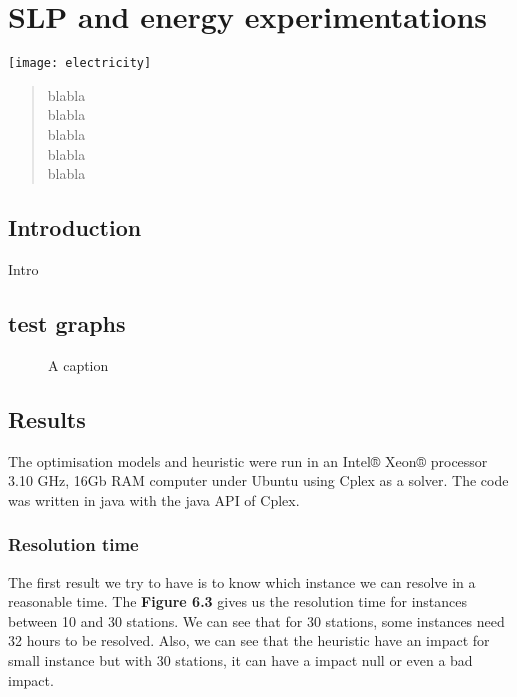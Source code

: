 \chapter{SLP and energy experimentations} \label{chap:slpEnergyExp}
\begin{bibunit}[ieeetr]
\minitoc
\vspace{2cm}

\begin{minipage}[c]{.3\linewidth}
\texttt{[image: electricity]}
\end{minipage}
\hfill
\begin{minipage}[c]{.7\linewidth}
\begin{abstract}
blabla\\
blabla\\
blabla\\
blabla\\
blabla\\
\end{abstract}
\end{minipage}


\section{Introduction}
Intro

\section{test graphs}

\begin{figure}[t]
\centering

\caption{A caption}
\label{plot:graphdensities}
\end{figure}


\section{Results}
The optimisation models and heuristic were run in an Intel® Xeon® processor 3.10 GHz, 16Gb RAM computer under Ubuntu using Cplex as a solver.
The code was written in java with the java API of Cplex. 

\subsection{Resolution time}
The first result we try to have is to know which instance we can resolve in a reasonable time.
The \textbf{Figure 6.3} gives us the resolution time for instances between 10 and 30 stations.
We can see that for 30 stations, some instances need 32 hours to be resolved.
Also, we can see that the heuristic have an impact for small instance but with 30 stations, it can have a impact null or even a bad impact. 


\end{bibunit}
